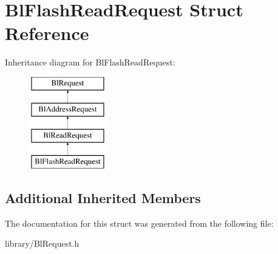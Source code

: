 \hypertarget{struct_bl_flash_read_request}{\section{Bl\-Flash\-Read\-Request Struct Reference}
\label{struct_bl_flash_read_request}
}
Inheritance diagram for Bl\-Flash\-Read\-Request\-:\begin{figure}[H]
\begin{center}
\leavevmode
\includegraphics[height=4.000000cm]{struct_bl_flash_read_request}
\end{center}
\end{figure}
\subsection*{Additional Inherited Members}


The documentation for this struct was generated from the following file\-:\begin{DoxyCompactItemize}
\item 
library/Bl\-Request.\-h\end{DoxyCompactItemize}
